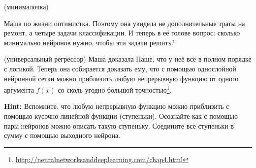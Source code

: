 \documentclass[12pt, a4paper, oneside]{article}
\theoremstyle{plain} %
\theoremstyle{definition}
\begin{document}
\begin{problem}{(минималочка)}
\begin{minipage}{0.25\linewidth}
\begin{center}
		\end{center} 
	\end{minipage} 
	
	Маша по жизни оптимистка. Поэтому она увидела не дополнительные траты на ремонт, а четыре задачи классификации. И теперь в её голове вопрос: сколько минимально нейронов нужно, чтобы эти задачи решить? 
\end{problem}


\begin{problem}{(универсальный регрессор)}
	Маша доказала Паше, что у неё всё в полном порядке с логикой. Теперь она собирается доказать ему, что с помощью однослойной нейронной сетки можно приблизить любую непрерывную функцию от одного аргумента $f(x)$ со сколь угодно большой точностью\footnote{\url{http://neuralnetworksanddeeplearning.com/chap4.html}}.  
	
	\textbf{Hint:}  Вспомните, что любую непрерывную функцию можно приблизить с помощью кусочно-линейной функции (ступеньки). Осознайте как с помощью пары нейронов можно описать такую ступеньку. Соедините все ступеньки в сумму с помощью выходного нейрона. 
\end{problem}
\end{document}
